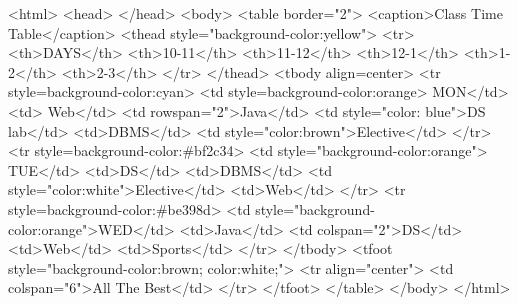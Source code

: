 <html> 
<head> 
</head> 
<body> 
    <table border="2"> 
        <caption>Class Time Table</caption> 
        <thead style="background-color:yellow"> 
            <tr> 
                <th>DAYS</th> 
                <th>10-11</th> 
                <th>11-12</th> 
                <th>12-1</th> 
                <th>1-2</th> 
                <th>2-3</th> 
            </tr> 
        </thead> 
        <tbody align=center> 
            <tr style=background-color:cyan> 
                <td style=background-color:orange> MON</td> 
                <td> Web</td> 
                <td rowspan="2">Java</td> 
                <td style="color: blue">DS lab</td> 
                <td>DBMS</td> 
                <td style="color:brown">Elective</td> 
            </tr> 
            <tr style=background-color:#bf2c34> 
                <td style="background-color:orange"> TUE</td> 
                <td>DS</td> 
                <td>DBMS</td> 
                <td style="color:white">Elective</td> 
                <td>Web</td> 
            </tr> 
            <tr style=background-color:#be398d> 
                <td style="background-color:orange">WED</td> 
                <td>Java</td> 
                <td colspan="2">DS</td> 
                <td>Web</td> 
                <td>Sports</td> 
            </tr> 
        </tbody> 
        <tfoot style="background-color:brown; color:white;"> 
            <tr align="center"> 
                <td colspan="6">All The Best</td> 
            </tr> 
        </tfoot> 
    </table> 
</body> 
</html>
